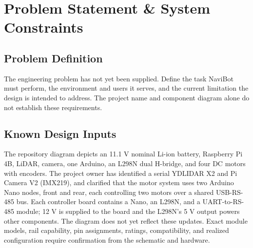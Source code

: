 \section{Problem Statement \& System Constraints}

\subsection{Problem Definition}
The engineering problem has not yet been supplied. Define the task NaviBot must perform, the environment and users it serves, and the current limitation the design is intended to address. The project name and component diagram alone do not establish these requirements.

\subsection{Known Design Inputs}
The repository diagram depicts an 11.1 V nominal Li-ion battery, Raspberry Pi 4B, LiDAR, camera, one Arduino, an L298N dual H-bridge, and four DC motors with encoders. The project owner has identified a serial YDLIDAR X2 and Pi Camera V2 (IMX219), and clarified that the motor system uses two Arduino Nano nodes, front and rear, each controlling two motors over a shared USB-RS-485 bus. Each controller board contains a Nano, an L298N, and a UART-to-RS-485 module; 12 V is supplied to the board and the L298N's 5 V output powers other components. The diagram does not yet reflect these updates. Exact module models, rail capability, pin assignments, ratings, compatibility, and realized configuration require confirmation from the schematic and hardware.

